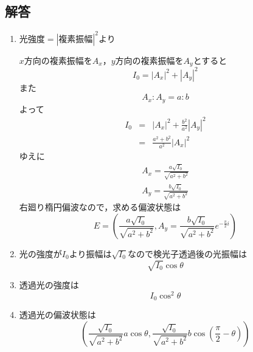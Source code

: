 \subsection*{解答}
\begin{enumerate}
    \renewcommand{\labelenumi}{(\alph{enumi})}
    \item $光強度=|複素振幅|^2$より\par
          $x$方向の複素振幅を$A_x$，$y$方向の複素振幅を$A_y$とすると
          \begin{displaymath}
            I_0=|A_x|^2+|A_y|^2
          \end{displaymath}
          また
          \begin{displaymath}
            A_x:A_y=a:b
          \end{displaymath}
          よって
          \begin{eqnarray*}
            I_0&=&|A_x|^2+\frac{b^2}{a^2}|A_y|^2\\
            &=&\frac{a^2+b^2}{a^2}|A_x|^2
          \end{eqnarray*}
          ゆえに
          \begin{eqnarray*}
            A_x=\frac{a\sqrt{I_0}}{\sqrt{a^2+b^2}}\\
            A_y=\frac{b\sqrt{I_0}}{\sqrt{a^2+b^2}}
          \end{eqnarray*}
          右廻り楕円偏波なので，求める偏波状態は
          \begin{displaymath}
            E=\left(\frac{a\sqrt{I_0}}{\sqrt{a^2+b^2}}, A_y=\frac{b\sqrt{I_0}}{\sqrt{a^2+b^2}}e^{-\frac{\pi}{2}i}\right)
          \end{displaymath}
    \item 光の強度が$I_0$より振幅は$\sqrt{I_0}$なので検光子透過後の光振幅は
          \begin{displaymath}
            \sqrt{I_0}\cos\theta
          \end{displaymath}
    \item 透過光の強度は
          \begin{displaymath}
            I_0\cos^2\theta
          \end{displaymath}
    \item 透過光の偏波状態は
          \begin{displaymath}
            \left(\frac{\sqrt{I_0}}{\sqrt{a^2+b^2}}a\cos\theta, \frac{\sqrt{I_0}}{\sqrt{a^2+b^2}}b\cos(\frac{\pi}{2}-\theta)\right)
          \end{displaymath}
\end{enumerate}

